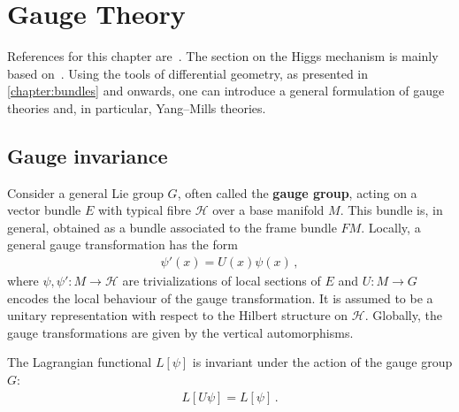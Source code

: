 \chapter{Gauge Theory}\label{chapter:gauge_theory}

    References for this chapter are~\citet{sontz_principal_2015,schuller_lectures_2016,nash_topology_2011,belgun_gauge_2024}. The section on the Higgs mechanism is mainly based on~\citet{choquet-bruhat_analysis_2000}. Using the tools of differential geometry, as presented in \cref{chapter:bundles} and onwards, one can introduce a general formulation of gauge theories and, in particular, Yang--Mills theories.

\section{Gauge invariance}

    Consider a general Lie group $G$, often called the \textbf{gauge group}, acting on a vector bundle $E$ with typical fibre $\mathcal{H}$ over a base manifold $M$. This bundle is, in general, obtained as a bundle associated to the frame bundle $FM$. Locally, a general gauge transformation has the form
    \begin{gather}
        \label{gauge:gauge_transformation}
        \psi'(x) = U(x)\psi(x)\,,
    \end{gather}
    where $\psi,\psi':M\rightarrow\mathcal{H}$ are trivializations of local sections of $E$ and $U:M\rightarrow G$ encodes the local behaviour of the gauge transformation. It is assumed to be a unitary representation with respect to the Hilbert structure on $\mathcal{H}$. Globally, the gauge transformations are given by the vertical automorphisms.

    \begin{axiom}
        The Lagrangian functional $L[\psi]$ is invariant under the action of the gauge group $G$:
        \begin{gather}
            L[U\psi] = L[\psi]\,.
        \end{gather}
    \end{axiom}


